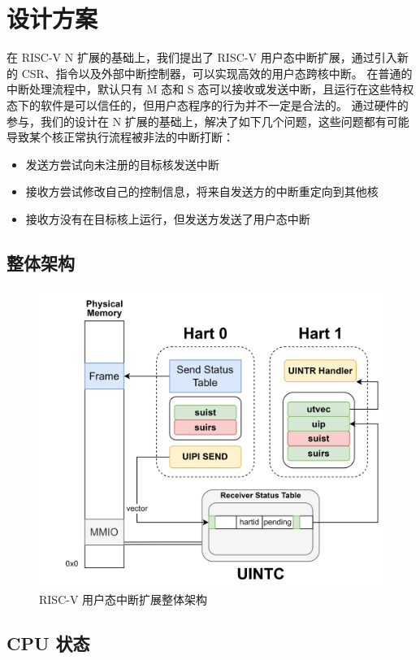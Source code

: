 
\chapter{设计方案}

在 RISC-V N 扩展的基础上，我们提出了 RISC-V 用户态中断扩展，通过引入新的 CSR、指令以及外部中断控制器，可以实现高效的用户态跨核中断。
在普通的中断处理流程中，默认只有 M 态和 S 态可以接收或发送中断，且运行在这些特权态下的软件是可以信任的，但用户态程序的行为并不一定是合法的。
通过硬件的参与，我们的设计在 N 扩展的基础上，解决了如下几个问题，这些问题都有可能导致某个核正常执行流程被非法的中断打断：

\begin{itemize}
    \item 发送方尝试向未注册的目标核发送中断
    \item 接收方尝试修改自己的控制信息，将来自发送方的中断重定向到其他核
    \item 接收方没有在目标核上运行，但发送方发送了用户态中断
\end{itemize}

\section{整体架构}

\begin{figure}
    \centering
    \includegraphics[width=0.8\linewidth]{figures/uintr.png}
    \caption{RISC-V 用户态中断扩展整体架构}
    \label{fig:uintr}
\end{figure}

\section{CPU 状态}

